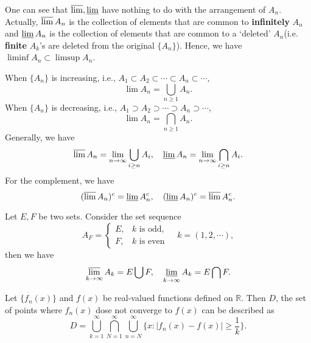 \documentclass[11pt,singlecolumn, openany, citestyle=authoryear]{elegantbook}
\begin{document}
\begin{CJK}{UTF8}{gbsn}
    One can see that $\varlimsup, \varliminf$ have nothing 
    to do with the arrangement of $A_n$. Actually, $\varlimsup A_n$ is the collection of elements
    that are common to \textbf{infinitely} $A_n$ and $\varliminf A_n$ is the collection of elements
    that are common to a `deleted' $A_n$(i.e. \textbf{finite} $A_k$'s are deleted from 
    the original $\{A_n\}$). Hence, we have $\liminf {A_n} \subset 
    \limsup {A_n}$.
    
    When $\{A_n\}$ is increasing, i.e.,
    $A_1 \subset A_2 \subset \cdots \subset A_n \subset \cdots$,
    \begin{equation}
        \lim A_n = \bigcup_{n \geq 1}A_n.
    \end{equation}
    When $\{A_n\}$ is decreasing, i.e.,
    $A_1 \supset A_2 \supset \cdots \supset A_n \supset \cdots$,
    \begin{equation}
        \lim A_n = \bigcap_{n \geq 1}A_n.
    \end{equation}
    Generally, we have
    \begin{equation}
        \varlimsup A_n = \lim_{n \to \infty}\bigcup_{i \geq n}A_i,
        \quad
        \varliminf A_n = \lim_{n \to \infty}\bigcap_{i \geq n}A_i.
    \end{equation}
    For the complement, we have 
    \begin{equation}
        (\varlimsup A_n)^c= \varliminf A_n^c,
        \quad
        (\varliminf A_n)^c = \varlimsup A_n^c.
    \end{equation}
    
    \begin{example}
        Let $E,F$ be two sets. Consider the set sequence 
        $$
        A_F = 
        \begin{cases}
            E, & k \text{ is odd},\\
            F, & k \text{ is even}
        \end{cases}\quad 
        k = (1,2,\cdots),
        $$
        then we have 
        $$
        \varlimsup_{k \to \infty} A_k = E \bigcup F, \quad 
        \varliminf_{k \to \infty} A_k = E \bigcap F.
        $$
    \end{example}
    
    \begin{example}
        Let $\{f_n(x)\}$ and $f(x)$ be real-valued functions defined on $\mathbb{R}$. Then $D$, 
        the set of points where $f_n(x)$ dose not converge to $f(x)$ can be described as 
        $$
        D = \bigcup_{k=1}^\infty \bigcap_{N=1}^\infty \bigcup_{n=N}^\infty 
        \{x: |f_n(x)-f(x)|\geqslant \frac{1}{k}\}.
        $$  
    

\end{example}
\end{CJK}
\end{document}
